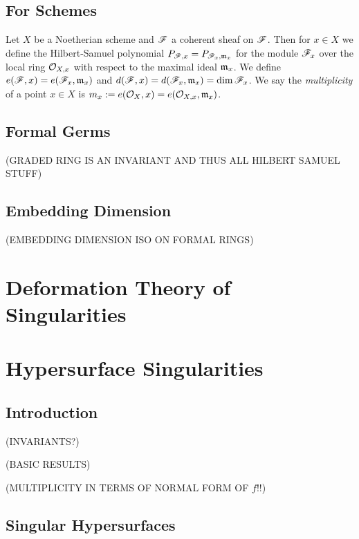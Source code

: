 \documentclass[12pt]{article}
\begin{document}
\subsection{For Schemes}

Let $X$ be a Noetherian scheme and $\mathscr{F}$ a coherent sheaf on $\mathscr{F}$. Then for $x \in X$ we define the Hilbert-Samuel polynomial $P_{\mathscr{F}, x} = P_{\mathscr{F}_x, \mathfrak{m}_x}$ for the module $\mathscr{F}_x$ over the local ring $\mathcal{O}_{X, x}$ with respect to the maximal ideal $\mathfrak{m}_x$. We define $e(\mathscr{F}, x) = e(\mathscr{F}_x, \mathfrak{m}_x)$ and $d(\mathscr{F}, x) = d(\mathscr{F}_x, \mathfrak{m}_x) = \dim{\mathscr{F}_x}$. We say the \textit{multiplicity} of a point $x \in X$ is $m_x := e(\mathcal{O}_{X}, x) = e(\mathcal{O}_{X, x}, \mathfrak{m}_x)$.

\subsection{Formal Germs}

(GRADED RING IS AN INVARIANT AND THUS ALL HILBERT SAMUEL STUFF)

\subsection{Embedding Dimension}

(EMBEDDING DIMENSION ISO ON FORMAL RINGS)

\section{Deformation Theory of Singularities}

\section{Hypersurface Singularities}

\subsection{Introduction}

(INVARIANTS?)

(BASIC RESULTS)

\begin{prop}
(MULTIPLICITY IN TERMS OF NORMAL FORM OF $f$!!)
\end{prop}

\subsection{Singular Hypersurfaces}
\end{document}
